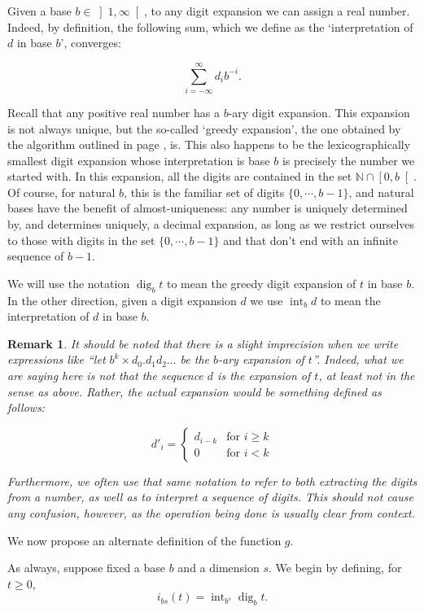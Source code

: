 \documentclass[11pt, reqno]{amsart}
\newcommand{\N}{\mathbb{N}}
\newtheorem{remark}{Remark}
\DeclareMathOperator{\dig}{dig}
\DeclareMathOperator{\intr}{int}
\begin{document}
Given a base $b \in \left]1, \infty \right[$, to any digit expansion we can assign a real number. Indeed, by definition, the following sum, which we define as the `interpretation of $d$ in base $b$', converges:

\[ \sum_{i = -\infty}^\infty d_i b^{-i}.\]

Recall that any positive real number has a $b$-ary digit expansion. This expansion is not always unique, but the so-called `greedy expansion', the one obtained by the algorithm outlined in page \pageref{digalg}, is. This also happens to be the lexicographically smallest digit expansion whose interpretation is base $b$ is precisely the number we started with. In this expansion, all the digits are contained in the set $\N \cap \left[0, b \right[$. Of course, for natural $b$, this is the familiar set of digits $\{0, \cdots, b-1 \}$, and natural bases have the benefit of almost-uniqueness: any number is uniquely determined by, and determines uniquely, a decimal expansion, as long as we restrict ourselves to those with digits in the set $\{0, \cdots, b-1 \}$ and that don't end with an infinite sequence of $b-1$.

We will use the notation $\dig_b t$ to mean the greedy digit expansion of $t$ in base $b$. In the other direction, given a digit expansion $d$ we use $\intr_b d$ to mean the interpretation of $d$ in base $b$.

\begin{remark}
It should be noted that there is a slight imprecision when we write expressions like ``let $b^k \times d_0 . d_1 d_2 \dots$ be the $b$-ary expansion of $t$''. Indeed, what we are saying here is not that the sequence $d$ is the expansion of $t$, at least not in the sense as above. Rather, the actual expansion would be something defined as follows:

\[d'_i =
\begin{cases}
d_{i-k} & \text{for $i \geq k$}\\
0 & \text{for $i < k$}
\end{cases}
\]

Furthermore, we often use that same notation to refer to both extracting the digits from a number, as well as to interpret a sequence of digits. This should not cause any confusion, however, as the operation being done is usually clear from context.
\end{remark}

We now propose an alternate definition of the function $g$.

As always, suppose fixed a base $b$ and a dimension $s$. We begin by defining, for $t \geq 0$,
\[ i_{bs}(t) = \intr_{b^s} \dig_b t.\]
\end{document}
